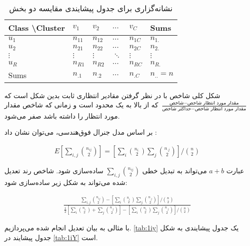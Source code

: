 \begin{table}[h]
\caption{
نشانه‌گزاری برای جدول پیشایندی مقایسه دو بخش
}
\centering
\bigskip
\begin{latin}
\begin{tabular}{l|llll|l}
Class \textbackslash Cluster & $v_1$    & $v_2$  & $\ldots$ & $v_C$  & Sums      \\ \hline
$u_1$                        & $n_{11}$ & $n_{12}$ & $\ldots$ & $n_{1C}$ & $n_{1.}$     \\
$u_2$                        & $n_{21}$ & $n_{22}$ & $\ldots$ & $n_{2C}$ & $n_{2.}$     \\
$\vdots$                     & $\vdots$ & $\vdots$ & $\ddots$ & $\vdots$ & $\vdots$     \\
$u_R$                        & $n_{R1}$ & $n_{R2}$ & $\ldots$ & $n_{RC}$ & $n_{R.}$     \\ \hline
Sums                         & $n_{.1}$ & $n_{.2}$ & $\ldots$ & $n_{.C}$ & $n_{..} = n$
\end{tabular}
\end{latin}
\label{tab:1iY}
\end{table}

شکل کلی شاخص با در نظر گرفتن مقادیر انتظاری ثابت بدین شکل است که 
$\frac{\text{شاخص} - \text{مقدار مورد انتظار شاخص} }
{\text{حداکثر شاخص} - \text{مقدار مورد انتظار شاخص} }$
که از بالا به یک محدود است و زمانی که شاخص مقدار مورد انتظار را داشته باشد صفر می‌شود.

بر اساس مدل جنرال فوق‌هندسی، می‌توان نشان داد
\cite{ari1985}
:

\begin{align}
E \left[ \sum_{i,j} \binom{n_{ij}}{2} \right] 
= \left[ \sum_i \binom{n_{i.}}{2} \sum_j \binom{n_{.j}}{2} \right] / \binom{n}{2}
\label{eq:1iw}
\end{align}

عبارت 
$a+b$
می‌تواند به تبدیل خطی 
$\sum_{i,j} \binom{n_{ij}}{2}$
ساده‌سازی شود. شاخص رند تعدیل شده می‌تواند به شکل زیر ساده‌سازی شود:
\cite{ari1985}

\begin{align}
\frac{ 
	\sum_{i,j} \binom{n_{ij}}{2}
	-
	\left[ \sum_i \binom{n_{i.}}{2} \sum_j \binom{n_{.j}}{2} \right] / \binom{n}{2}
 }{
	\frac{1}{2} 
	\left[ 
		\sum_i 
		\binom{n_{i.}}{2}
		+
		\sum_j
		\binom{n_{.j}}{2}
	\right]
	-
	\left[ \sum_i \binom{n_{i.}}{2} \sum_j \binom{n_{.j}}{2} \right] / \binom{n}{2}
}
\label{eq:1ix}
\end{align}

با مثالی به بیان تعدیل انجام شده می‌پردازیم. 
\autoref{tab:1iy}
یک جدول پیشایندی به شکل جدول پیشایند در 
\autoref{tab:1iY}
است.

